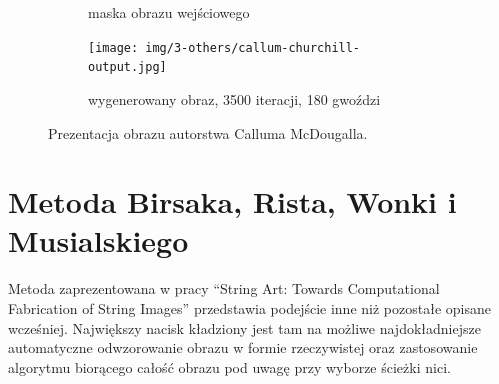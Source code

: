 \begin{figure}[H]
\begin{subfigure}{0.32\textwidth}
            \caption{maska obrazu wejściowego}
            \label{others-callum-output-b}
        \end{subfigure}
        \begin{subfigure}{0.32\textwidth}
            \centering
            \texttt{[image: img/3-others/callum-churchill-output.jpg]}
            \caption{wygenerowany obraz, 3500 iteracji, 180 gwoździ}
            \label{others-callum-output-c}
        \end{subfigure}
        \caption{Prezentacja obrazu autorstwa Calluma McDougalla.}
        \label{others-callum-output}
        \end{figure}
        
    \section{Metoda Birsaka, Rista, Wonki i Musialskiego} \label{others-birsak}
    Metoda zaprezentowana w pracy ``String Art: Towards Computational Fabrication of String Images'' \cite{article-string-art-birsak} przedstawia podejście inne niż pozostałe opisane wcześniej. Największy nacisk kładziony jest tam na możliwe najdokładniejsze automatyczne odwzorowanie obrazu w formie rzeczywistej oraz zastosowanie algorytmu biorącego całość obrazu pod uwagę przy wyborze ścieżki nici. 
    
